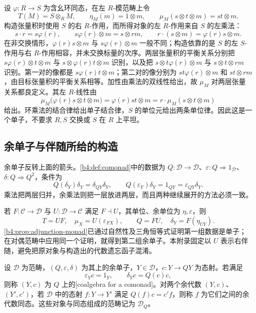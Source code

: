 \begin{example}\label{b4:exm:A-extension-scalars-monad}
	设 \(\varphi:R\rightarrow S\) 为含幺环同态，在左 \(R\)-模范畴上令
	\[
		T(M)=S\otimes_RM,\qquad \eta_M(m)=1\otimes m,\qquad \mu_M(s\otimes t\otimes m)=st\otimes m.
	\]
	构造张量积时使用 \(S\) 的右 \(R\)-作用，而所得对象的左 \(R\)-作用来自 \(S\) 的左乘法：
	\[
		s\cdot r=s\varphi(r),\qquad s\varphi(r)\otimes m=s\otimes rm,\qquad r\cdot(s\otimes m)=\varphi(r)s\otimes m.
	\]
	在非交换情形，\(\varphi(r)s\otimes m\) 与 \(s\varphi(r)\otimes m\) 一般不同；构造依靠的是 \(S\) 的左 \(S\)-作用与右 \(R\)-作用相容，并未交换标量的次序。两层张量积的平衡关系分别把 \(s\varphi(r)\otimes t\otimes m\) 与 \(s\otimes\varphi(r)t\otimes m\) 识别，以及把 \(s\otimes t\varphi(r)\otimes m\) 与 \(s\otimes t\otimes rm\) 识别。第一对的像都是 \(s\varphi(r)t\otimes m\)；第二对的像分别为 \(st\varphi(r)\otimes m\) 和 \(st\otimes rm\)，由目标张量积的平衡关系相等。加性由乘法的双线性给出，故 \(\mu_M\) 对两层张量关系都良定义。其左 \(R\)-线性由
	\[
		\mu_M\bigl(\varphi(r)s\otimes t\otimes m\bigr) =\varphi(r)st\otimes m =r\cdot\mu_M(s\otimes t\otimes m)
	\]
	给出。环乘法的结合律给出单子结合律，\(S\) 的单位元给出两条单位律。因此这是一个单子，不要求 \(R,S\) 交换或 \(S\) 在 \(R\) 上平坦。
\end{example}

\subsection{余单子与伴随所给的构造}
\label{b4:subsec:A01:02}

余单子反转上面的箭头。\cref{b4:def:comonad}中的数据为 \(Q:\mathcal D\to\mathcal D\)、\(\varepsilon:Q\Rightarrow1_{\mathcal D}\)、 \(\delta:Q\Rightarrow Q^2\)，条件为
\[
	Q(\delta_Y)\delta_Y=\delta_{QY}\delta_Y,\qquad Q(\varepsilon_Y)\delta_Y=1_{QY}=\varepsilon_{QY}\delta_Y.
\]
乘法把两层归并，余乘法则把一层放进两层，而且两种继续展开的方法必须一致。

\ProseParagraphBreak

若 \(F:\mathcal C\to\mathcal D\) 与 \(U:\mathcal D\to\mathcal C\) 满足 \(F\dashv U\)，其单位、余单位为 \(\eta,\varepsilon\)，则
\[
	T=UF,\quad \mu_X=U(\varepsilon_{FX}),\qquad Q=FU,\quad \delta_Y=F(\eta_{UY}).
\]
\cref{b4:prop:adjunction-monad}已通过自然性及三角恒等式证明第一组数据是单子；在对偶范畴中应用同一个证明，就得到第二组余单子。本附录固定以 \(U\) 表示右伴随，避免把原对象与构造出的代数遗忘函子混淆。

\begin{definition}\label{b4:def:A-comonad-coalgebra}
	设 \(\mathcal D\) 为范畴，\((Q,\varepsilon,\delta)\) 为其上的余单子，\(Y\in\mathcal D\)，\(c:Y\to QY\) 为态射。若满足
	\[
		\varepsilon_Yc=1_Y,\qquad \delta_Yc=Q(c)c,
	\]
	则称 \((Y,c)\) 为 \(Q\) 上的[coalgebra for a comonad]。对两个余代数 \((Y,c)\)、\((Y',c')\)，若 \(\mathcal D\) 中的态射 \(f:Y\to Y'\) 满足 \(Q(f)c=c'f\)，则称 \(f\) 为它们之间的余代数同态。这些对象与同态组成的范畴记为 \(\mathcal D_Q\)。
\end{definition}

